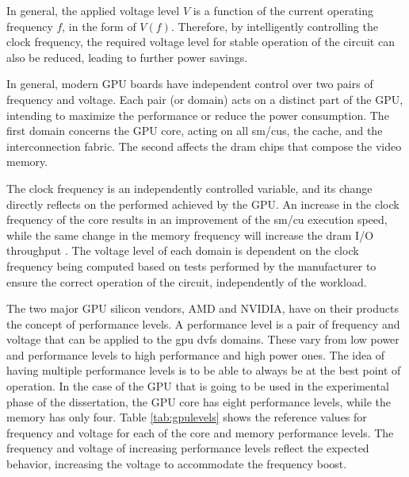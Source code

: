 In general, the applied voltage level $V$ is a function of the current operating frequency $f$, in the form of $V(f)$. Therefore, by intelligently controlling the clock frequency, the required voltage level for stable operation of the circuit can also be reduced, leading to further power savings.

In general, modern GPU boards have independent control over two pairs of frequency and voltage. Each pair (or domain) acts on a distinct part of the GPU, intending to maximize the performance or reduce the power consumption. The first domain concerns the GPU core, acting on all \acrshort{sm}/\acrshort{cu}s, the cache, and the interconnection fabric. The second affects the \acrshort{dram} chips that compose the video memory. 

The clock frequency is an independently controlled variable, and its change directly reflects on the performed achieved by the GPU. An increase in the clock frequency of the core results in an improvement of the \acrshort{sm}/\acrshort{cu} execution speed, while the same change in the memory frequency will increase the \acrshort{dram} I/O throughput \cite{mei_survey_2016}. The voltage level of each domain is dependent on the clock frequency being computed based on tests performed by the manufacturer to ensure the correct operation of the circuit, independently of the workload.

The two major GPU silicon vendors, AMD and NVIDIA, have on their products the concept of performance levels. A performance level is a pair of frequency and voltage that can be applied to the \acrshort{gpu} \acrshort{dvfs} domains. These vary from low power and performance levels to high performance and high power ones. The idea of having multiple performance levels is to be able to always be at the best point of operation.  In the case of the GPU that is going to be used in the experimental phase of the dissertation, the GPU core has eight performance levels, while the memory has only four. Table \ref{tab:gpulevels} shows the reference values for frequency and voltage for each of the core and memory performance levels. The frequency and voltage of increasing performance levels reflect the expected behavior, increasing the voltage to accommodate the frequency boost.

